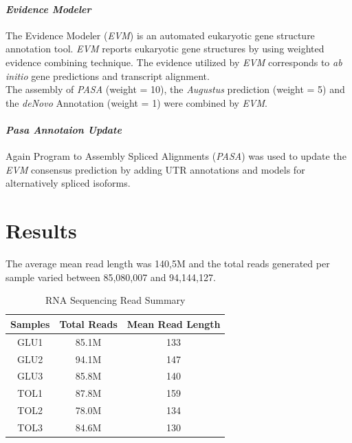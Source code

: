 \documentclass[12pt, a4paper]{report}
\begin{document}
\subsubsection{\textit{Evidence Modeler}}
The Evidence Modeler (\textit{EVM}) is an automated eukaryotic gene structure annotation tool. \textit{EVM} reports eukaryotic gene structures by using weighted evidence combining technique. The evidence utilized by \textit{EVM} corresponds to \textit{ab initio} gene predictions and transcript alignment. \cite{Haas2008} \\
The assembly of \textit{PASA} (weight = 10), the \textit{Augustus} prediction (weight = 5) and the \textit{deNovo} Annotation (weight = 1) were combined by \textit{EVM}.

\subsubsection{\textit{Pasa Annotaion Update}}
Again Program to Assembly Spliced Alignments (\textit{PASA}) was used to update the \textit{EVM} consensus prediction by adding UTR annotations and models for alternatively spliced isoforms.


\newpage
\setcounter{chapter}{3}\setcounter{section}{0}
\chapter*{Results}
The average mean read length was 140,5M and the total reads generated per sample varied between 85,080,007 and 94,144,127. 
\begin{table}[H]
	\centering
	\begin{tabular}{|c|c|c|}
		\hline
		\textbf{Samples} & \textbf{Total Reads} & \textbf{Mean Read Length}  \\
		\hline
		GLU1 & 85.1M & 133 \\
		\hline
		GLU2 & 94.1M & 147  \\
		\hline
		GLU3 & 85.8M & 140  \\
		\hline
		TOL1 & 87.8M & 159  \\
		\hline
		TOL2 & 78.0M & 134  \\
		\hline
		TOL3 & 84.6M & 130  \\
		\hline
	\end{tabular}
	\caption{RNA Sequencing Read Summary}
\end{table}
\end{document}
